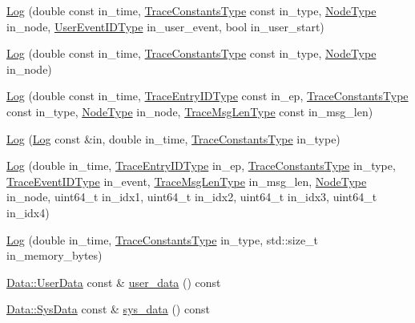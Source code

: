\begin{DoxyCompactItemize}
\item 
\hyperlink{structvt_1_1trace_1_1_log_a79db16327d513ab1b4ecd114a5661e71}{Log} (double const in\+\_\+time, \hyperlink{namespacevt_1_1trace_acf454dfbd581b0ebae895f90b5927a1d}{Trace\+Constants\+Type} const in\+\_\+type, \hyperlink{namespacevt_a866da9d0efc19c0a1ce79e9e492f47e2}{Node\+Type} in\+\_\+node, \hyperlink{namespacevt_1_1trace_a5908920d051c144c89f17c69ed262350}{User\+Event\+I\+D\+Type} in\+\_\+user\+\_\+event, bool in\+\_\+user\+\_\+start)
\item 
\hyperlink{structvt_1_1trace_1_1_log_acdd2da55901a3de70e02d68f78b6d3b6}{Log} (double const in\+\_\+time, \hyperlink{namespacevt_1_1trace_acf454dfbd581b0ebae895f90b5927a1d}{Trace\+Constants\+Type} const in\+\_\+type, \hyperlink{namespacevt_a866da9d0efc19c0a1ce79e9e492f47e2}{Node\+Type} in\+\_\+node)
\item 
\hyperlink{structvt_1_1trace_1_1_log_a6a70a5ee694d066e4cd7332e4c11ad52}{Log} (double const in\+\_\+time, \hyperlink{namespacevt_1_1trace_a3c14050715ba9eceaeff51fb3de64f2f}{Trace\+Entry\+I\+D\+Type} const in\+\_\+ep, \hyperlink{namespacevt_1_1trace_acf454dfbd581b0ebae895f90b5927a1d}{Trace\+Constants\+Type} const in\+\_\+type, \hyperlink{namespacevt_a866da9d0efc19c0a1ce79e9e492f47e2}{Node\+Type} in\+\_\+node, \hyperlink{namespacevt_1_1trace_aeb598f45d67d41db7902e494f2f0ce59}{Trace\+Msg\+Len\+Type} const in\+\_\+msg\+\_\+len)
\item 
\hyperlink{structvt_1_1trace_1_1_log_a3824153f3da56014a1473b518eee5654}{Log} (\hyperlink{structvt_1_1trace_1_1_log}{Log} const \&in, double in\+\_\+time, \hyperlink{namespacevt_1_1trace_acf454dfbd581b0ebae895f90b5927a1d}{Trace\+Constants\+Type} in\+\_\+type)
\item 
\hyperlink{structvt_1_1trace_1_1_log_ab48521fa03009ac8033116f7f06b195b}{Log} (double in\+\_\+time, \hyperlink{namespacevt_1_1trace_a3c14050715ba9eceaeff51fb3de64f2f}{Trace\+Entry\+I\+D\+Type} in\+\_\+ep, \hyperlink{namespacevt_1_1trace_acf454dfbd581b0ebae895f90b5927a1d}{Trace\+Constants\+Type} in\+\_\+type, \hyperlink{namespacevt_1_1trace_a64a7185f3e102df8d8258f263ccd1582}{Trace\+Event\+I\+D\+Type} in\+\_\+event, \hyperlink{namespacevt_1_1trace_aeb598f45d67d41db7902e494f2f0ce59}{Trace\+Msg\+Len\+Type} in\+\_\+msg\+\_\+len, \hyperlink{namespacevt_a866da9d0efc19c0a1ce79e9e492f47e2}{Node\+Type} in\+\_\+node, uint64\+\_\+t in\+\_\+idx1, uint64\+\_\+t in\+\_\+idx2, uint64\+\_\+t in\+\_\+idx3, uint64\+\_\+t in\+\_\+idx4)
\item 
\hyperlink{structvt_1_1trace_1_1_log_aaa26486d549d2e6792603318813d4e83}{Log} (double in\+\_\+time, \hyperlink{namespacevt_1_1trace_acf454dfbd581b0ebae895f90b5927a1d}{Trace\+Constants\+Type} in\+\_\+type, std\+::size\+\_\+t in\+\_\+memory\+\_\+bytes)
\item 
\hyperlink{structvt_1_1trace_1_1_log_1_1_data_1_1_user_data}{Data\+::\+User\+Data} const  \& \hyperlink{structvt_1_1trace_1_1_log_a7b251bc7dcebcbbafa29cc2ca6ea4c12}{user\+\_\+data} () const
\item 
\hyperlink{structvt_1_1trace_1_1_log_1_1_data_1_1_sys_data}{Data\+::\+Sys\+Data} const  \& \hyperlink{structvt_1_1trace_1_1_log_a082937c397ac5b47ffc9089ff94698f0}{sys\+\_\+data} () const
\end{DoxyCompactItemize}
